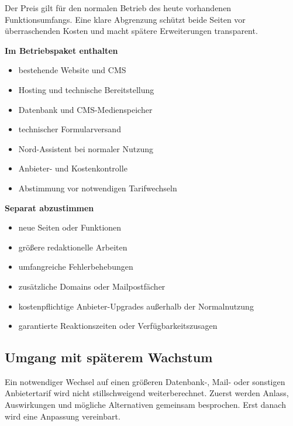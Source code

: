 \documentclass[11pt,a4paper]{article}
\begin{document}
Der Preis gilt für den normalen Betrieb des heute vorhandenen Funktionsumfangs. Eine klare Abgrenzung schützt beide Seiten vor überraschenden Kosten und macht spätere Erweiterungen transparent.

\noindent
\begin{minipage}[t]{0.487\textwidth}
  \begin{bluebox}[height=79mm]
    {\sffamily\large\bfseries\color{NordNavy}Im Betriebspaket enthalten}
    \begin{itemize}
      \item bestehende Website und CMS
      \item Hosting und technische Bereitstellung
      \item Datenbank und CMS-Medienspeicher
      \item technischer Formularversand
      \item Nord-Assistent bei normaler Nutzung
      \item Anbieter- und Kostenkontrolle
      \item Abstimmung vor notwendigen Tarifwechseln
    \end{itemize}
  \end{bluebox}
\end{minipage}\hfill
\begin{minipage}[t]{0.487\textwidth}
  \begin{softbox}[height=79mm]
    {\sffamily\large\bfseries\color{NordNavy}Separat abzustimmen}
    \begin{itemize}
      \item neue Seiten oder Funktionen
      \item größere redaktionelle Arbeiten
      \item umfangreiche Fehlerbehebungen
      \item zusätzliche Domains oder Mailpostfächer
      \item kostenpflichtige Anbieter-Upgrades außerhalb der Normalnutzung
      \item garantierte Reaktionszeiten oder Verfügbarkeitszusagen
    \end{itemize}
  \end{softbox}
\end{minipage}

\subsection{Umgang mit späterem Wachstum}

Ein notwendiger Wechsel auf einen größeren Datenbank-, Mail- oder sonstigen Anbietertarif wird nicht stillschweigend weiterberechnet. Zuerst werden Anlass, Auswirkungen und mögliche Alternativen gemeinsam besprochen. Erst danach wird eine Anpassung vereinbart.
\end{document}

